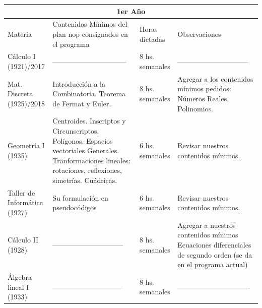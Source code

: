\documentclass[a4paper,10pt,BCOR10mm,oneside,headsepline]{scrbook}
\begin{document}
\begin{subappendices}
\begin{tabular}{|p{3cm}|p{4cm}|p{2cm}|p{2cm}|}
\hline
\multicolumn{4}{|c|}{1er Año }\\ \hline
Materia    & Contenidos Mínimos del plan nop consignados en el programa                                                                                                                        & Horas dictadas  & Observaciones                                                                                                        \\ \hline
Cálculo I (1921)/2017        & --------------------------------                                                                                                                             & 8 hs. semanales & ------------------------------                                                                                       \\ \hline
Mat. Discreta (1925)/2018    & Introducción a la Combinatoria. Teorema de Fermat y Euler.                                                                                                   & 8 hs. semanales & Agregar a los contenidos mínimos pedidos: Números Reales. Polinomios.   \\ \hline
Geometría I (1935)           & Centroides. Inscriptos y Circunscriptos. Polígonos. Espacios vectoriales Generales. Tranformaciones lineales: rotaciones, reflexiones, simetrías. Cuádricas. & 6 hs. semanales & Revisar nuestros contenidos mínimos.                                                                                 \\ \hline
Taller de Informática (1927) & Su formulación en pseudocódigos                                                                                                                              & 6 hs. semanales & Revisar nuestros contenidos mínimos.                                                                                 \\ \hline
Cálculo II (1928)            & ------------------------------                                                                                                                               & 8 hs. semanales & Agregar a nuestros contenidos mínimos Ecuaciones diferenciales de segundo orden (se da en el programa actual)        \\ \hline
Álgebra lineal I (1933)      & ------------------------------                                                                                                                               & 8 hs. semanales & -------------------------------                                                                                      \\ \hline
\end{tabular}










\end{subappendices}
\end{document}
